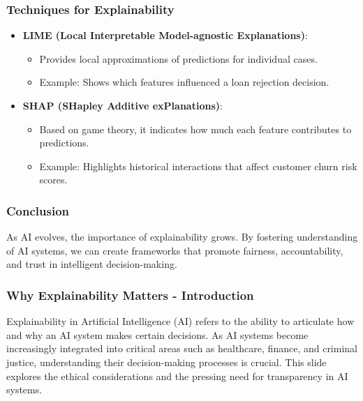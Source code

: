 \documentclass[aspectratio=169]{beamer}
\begin{document}
\begin{frame}[fragile]
    \frametitle{Techniques for Explainability}
    \begin{itemize}
        \item \textbf{LIME (Local Interpretable Model-agnostic Explanations)}:
        \begin{itemize}
            \item Provides local approximations of predictions for individual cases.
            \item Example: Shows which features influenced a loan rejection decision.
        \end{itemize}
        
        \item \textbf{SHAP (SHapley Additive exPlanations)}:
        \begin{itemize}
            \item Based on game theory, it indicates how much each feature contributes to predictions.
            \item Example: Highlights historical interactions that affect customer churn risk scores.
        \end{itemize}
    \end{itemize}
\end{frame}

\begin{frame}[fragile]
    \frametitle{Conclusion}
    As AI evolves, the importance of explainability grows. By fostering understanding of AI systems, we can create frameworks that promote fairness, accountability, and trust in intelligent decision-making.
\end{frame}

\begin{frame}[fragile]
    \frametitle{Why Explainability Matters - Introduction}
    Explainability in Artificial Intelligence (AI) refers to the ability to articulate how and why an AI system makes certain decisions. 
    As AI systems become increasingly integrated into critical areas such as healthcare, finance, and criminal justice, understanding their decision-making processes is crucial. 
    This slide explores the ethical considerations and the pressing need for transparency in AI systems.
\end{frame}
\end{document}

